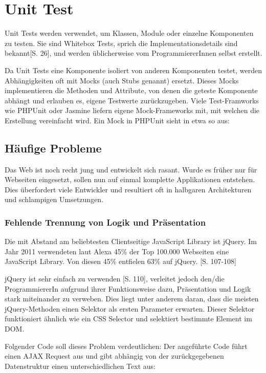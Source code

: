 \documentclass[a4paper,bibtotoc,oneside]{scrbook}
\begin{document}
\chapter{Unit Test}
Unit Tests werden verwendet, um Klassen, Module oder einzelne Komponenten zu testen. Sie sind Whitebox Tests, sprich die Implementationsdetails sind bekannt\cite{betrieb}[S. 26], und werden üblicherweise vom ProgrammiererInnen selbst erstellt. 

Da Unit Tests eine Komponente isoliert von anderen Komponenten testet, werden Abhängigkeiten oft mit Mocks (auch Stubs genannt) ersetzt. Dieses Mocks implementieren die Methoden und Attribute, von denen die geteste Komponente abhängt und erlauben es, eigene Testwerte zurückzugeben. Viele Test-Framworks wie PHPUnit oder Jasmine liefern eigene Mock-Frameworks mit, mit welchen die Erstellung vereinfacht wird. Ein Mock in PHPUnit sieht in etwa so aus:



\section{Häufige Probleme}
Das Web ist noch recht jung und entwickelt sich rasant. Wurde es früher nur für Webseiten eingesetzt, sollen nun auf einmal komplette Applikationen entstehen. Dies überfordert viele Entwickler und resultiert oft in halbgaren Architekturen und schlampigen Umsetzungen. 


\subsection{Fehlende Trennung von Logik und Präsentation}
Die mit Abstand am beliebtesten Clientseitige JavaScript Library ist jQuery. Im Jahr 2011 verwendeten laut Alexa 45\% der Top 100.000 Webseiten eine JavaScript Library. Von diesen 45\% entfielen 63\% auf jQuery. \cite{jquery}[S. 107-108]

jQuery ist sehr einfach zu verwenden \cite{jquery}[S. 110], verleitet jedoch den/die ProgrammiererIn aufgrund ihrer Funktionsweise dazu, Präsentation und Logik stark miteinander zu verweben. Dies liegt unter anderem daran, dass die meisten jQuery-Methoden einen Selektor als ersten Parameter erwarten. Dieser Selektor funktioniert ähnlich wie ein CSS Selector und selektiert bestimmte Element im DOM. \cite{jquery_selectors}

Folgender Code soll dieses Problem verdeutlichen: Der angeführte Code führt einen AJAX Request aus und gibt abhängig von der zurückgegebenen Datenstruktur einen unterschiedlichen Text aus:
\newpage


\end{document}
